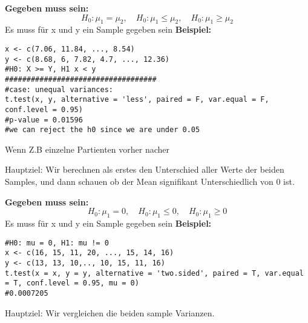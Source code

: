 \large{\textbf{Gegeben muss sein:}}
\[
H_0: \mu_1 = \mu_2, \quad 
H_0: \mu_1 \leq \mu_2, \quad 
H_0: \mu_1 \geq \mu_2
\]
\textcolor{red}{\warning} Es muss für x und y ein Sample gegeben sein \textcolor{red}{\warning}
\large{\textbf{Beispiel:}}
\begin{lstlisting}
x <- c(7.06, 11.84, ..., 8.54)
y <- c(8.68, 6, 7.82, 4.7, ..., 12.36)
#H0: X >= Y, H1 x < y
###################################
#case: unequal variances:
t.test(x, y, alternative = 'less', paired = F, var.equal = F, conf.level = 0.95)
#p-value = 0.01596
#we can reject the h0 since we are under 0.05
\end{lstlisting}

\columnbreak
\begin{center}
    
\end{center}
\textcolor{red}{\warning}Wenn Z.B einzelne Partienten vorher nacher\textcolor{red}{\warning}

\normalsize
Hauptziel: Wir berechnen als erstes den Unterschied aller Werte der beiden Samples, und dann schauen ob der Mean signifikant Unterschiedlich von 0 ist.
\normalsize
\begin{center}
\end{center}

\large{\textbf{Gegeben muss sein:}}
\[
H_0: \mu_1 = 0, \quad 
H_0: \mu_1 \leq 0, \quad 
H_0: \mu_1 \geq 0
\]
\textcolor{red}{\warning} Es muss für x und y ein Sample gegeben sein \textcolor{red}{\warning}
\large{\textbf{Beispiel:}}
\begin{lstlisting}
#H0: mu = 0, H1: mu != 0
x <- c(16, 15, 11, 20, ..., 15, 14, 16)
y <- c(13, 13, 10,.., 10, 15, 11, 16)
t.test(x = x, y = y, alternative = 'two.sided', paired = T, var.equal = T, conf.level = 0.95, mu = 0)
#0.0007205
\end{lstlisting}

\begin{center}
    
\end{center}
\normalsize
Hauptziel: Wir vergleichen die beiden sample Varianzen.
\normalsize
\begin{center}
\end{center}

